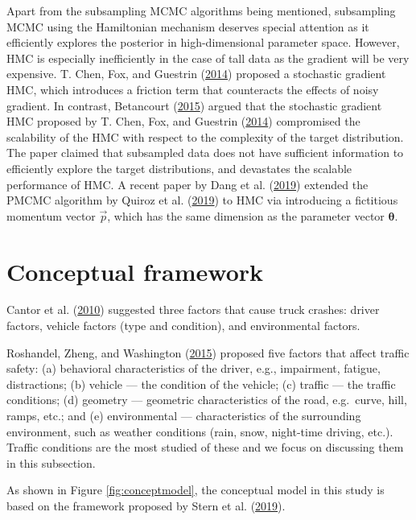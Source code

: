 \documentclass[12pt]{book}
\numberwithin{equation}{chapter}
\begin{document}
Apart from the subsampling MCMC algorithms being mentioned, subsampling MCMC using the Hamiltonian mechanism deserves special attention as it efficiently explores the posterior in high-dimensional parameter space. However, HMC is especially inefficiently in the case of tall data as the gradient will be very expensive. T. Chen, Fox, and Guestrin (\protect\hyperlink{ref-chen2014stochastic}{2014}) proposed a stochastic gradient HMC, which introduces a friction term that counteracts the effects of noisy gradient. In contrast, Betancourt (\protect\hyperlink{ref-betancourt2015fundamental}{2015}) argued that the stochastic gradient HMC proposed by T. Chen, Fox, and Guestrin (\protect\hyperlink{ref-chen2014stochastic}{2014}) compromised the scalability of the HMC with respect to the complexity of the target distribution. The paper claimed that subsampled data does not have sufficient information to efficiently explore the target distributions, and devastates the scalable performance of HMC. A recent paper by Dang et al. (\protect\hyperlink{ref-dang2019hamiltonian}{2019}) extended the PMCMC algorithm by Quiroz et al. (\protect\hyperlink{ref-quiroz2019speeding}{2019}) to HMC via introducing a fictitious momentum vector \(\vec{p}\), which has the same dimension as the parameter vector \(\mathbf{\theta}\).

\hypertarget{conceptual-framework}{%
\section{Conceptual framework}\label{conceptual-framework}}

Cantor et al. (\protect\hyperlink{ref-cantor2010driver}{2010}) suggested three factors that cause truck crashes: driver factors, vehicle factors (type and condition), and environmental factors.

Roshandel, Zheng, and Washington (\protect\hyperlink{ref-roshandel2015impact}{2015}) proposed five factors that affect traffic safety: (a) behavioral characteristics of the driver, e.g., impairment, fatigue, distractions; (b) vehicle --- the condition of the vehicle; (c) traffic --- the traffic conditions; (d) geometry --- geometric characteristics of the road, e.g.~curve, hill, ramps, etc.; and (e) environmental --- characteristics of the surrounding environment, such as weather conditions (rain, snow, night-time driving, etc.). Traffic conditions are the most studied of these and we focus on discussing them in this subsection.

As shown in Figure \ref{fig:conceptmodel}, the conceptual model in this study is based on the framework proposed by Stern et al. (\protect\hyperlink{ref-stern2019data}{2019}).
\end{document}
